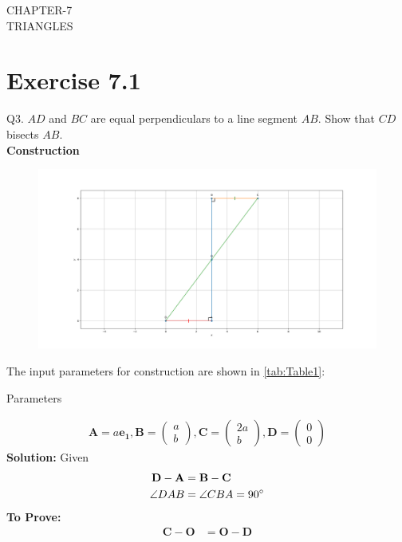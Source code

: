 \documentclass{article}
\newcommand{\solution}{\noindent \textbf{Solution: }}
\newcommand{\myvec}[1]{\ensuremath{\begin{pmatrix}#1\end{pmatrix}}}
\let\vec\mathbf
\begin{document}
\begin{center}
        \textbf\large{CHAPTER-7 \\ TRIANGLES}
\end{center}
\section{Exercise 7.1}
Q3. $AD$ and $BC$ are equal perpendiculars to a line segment $AB$. Show that $CD$ bisects $AB$.\\
\textbf{Construction}\\
\begin{figure}[h]
	\begin{center}
		\includegraphics[width=\columnwidth]{figs/Figure1.png}
	\end{center}
	\label{fig:Fig1}
\end{figure}
The input parameters for construction are shown in \ref{tab:Table1}:\\
\begin{table}[h]
	  \centering
	  
	  \caption{Parameters}
	  \label{tab:Table1}
\end{table}
\pagebreak
\begin{align}
	\vec{A} = a\vec{e_1},\vec{B} = \myvec{a\\b},\vec{C} = \myvec{2a\\b},\vec{D} = \myvec{0\\0}
\end{align}
\solution
Given
\begin{align}
	\vec{D}-\vec{A}&=\vec{B}-\vec{C}\\
	\angle DAB &= \angle CBA=90\degree
\end{align}
\textbf{To Prove:}\\
\begin{align}
	\vec{C}-\vec{O}&=\vec{O}-\vec{D}
\end{align}
\end{document}
